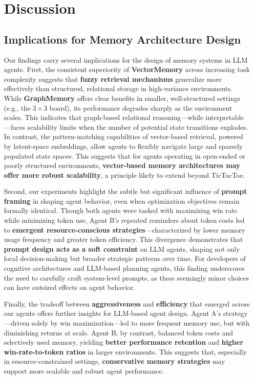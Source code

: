 \documentclass[10pt]{article}
\begin{document}
\section{Discussion}

\subsection{Implications for Memory Architecture Design}

Our findings carry several implications for the design of memory systems in LLM agents. First, the consistent superiority of \textbf{VectorMemory} across increasing task complexity suggests that \textbf{fuzzy retrieval mechanisms} generalize more effectively than structured, relational storage in high-variance environments. While \textbf{GraphMemory} offers clear benefits in smaller, well-structured settings (e.g., the $3 \times 3$ board), its performance degrades sharply as the environment scales. This indicates that graph-based relational reasoning—while interpretable—faces scalability limits when the number of potential state transitions explodes. In contrast, the pattern-matching capabilities of vector-based retrieval, powered by latent-space embeddings, allow agents to flexibly navigate large and sparsely populated state spaces. This suggests that for agents operating in open-ended or poorly structured environments, \textbf{vector-based memory architectures may offer more robust scalability}, a principle likely to extend beyond TicTacToe.

Second, our experiments highlight the subtle but significant influence of \textbf{prompt framing} in shaping agent behavior, even when optimization objectives remain formally identical. Though both agents were tasked with maximizing win rate while minimizing token use, Agent B's repeated reminders about token costs led to \textbf{emergent resource-conscious strategies}—characterized by lower memory usage frequency and greater token efficiency. This divergence demonstrates that \textbf{prompt design acts as a soft constraint} on LLM agents, shaping not only local decision-making but broader strategic patterns over time. For developers of cognitive architectures and LLM-based planning agents, this finding underscores the need to carefully craft system-level prompts, as these seemingly minor choices can have outsized effects on agent behavior.

Finally, the tradeoff between \textbf{aggressiveness} and \textbf{efficiency} that emerged across our agents offers further insights for LLM-based agent design. Agent A's strategy—driven solely by win maximization—led to more frequent memory use, but with diminishing returns at scale. Agent B, by contrast, balanced token costs and selectively used memory, yielding \textbf{better performance retention} and \textbf{higher win-rate-to-token ratios} in larger environments. This suggests that, especially in resource-constrained settings, \textbf{conservative memory strategies} may support more scalable and robust agent performance.
\end{document}

